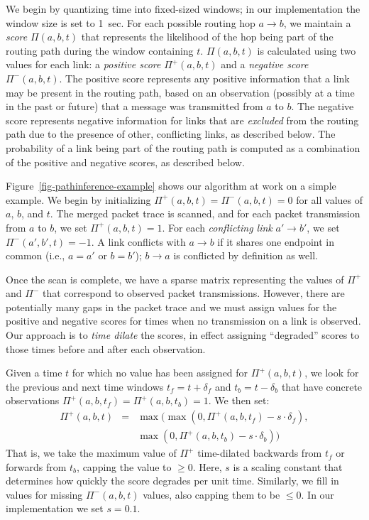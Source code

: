 We begin by quantizing time into fixed-sized windows;
in our implementation the window size is set to 1~sec.
For each possible routing hop $a \rightarrow b$, we maintain a 
{\em score} $\Pi(a,b,t)$ that represents the likelihood of the hop
being part of the routing path during the window containing $t$.
$\Pi(a,b,t)$ is calculated using two values for each link:
a {\em positive score} $\Pi^+(a,b,t)$ and a {\em negative score}
$\Pi^-(a,b,t)$. The positive score represents any positive information
that a link may be present in the routing path, based on an
observation (possibly at a time in the past or future) that a message was
transmitted from $a$ to $b$. The negative score represents negative
information for links that are {\em excluded} from the routing path
due to the presence of other, conflicting links, as described below.
The probability of a link being part of the routing path 
is computed as a combination of the positive and negative scores, 
as described below.

Figure~\ref{fig-pathinference-example} shows our algorithm at work 
on a simple example.  We begin by initializing
$\Pi^+(a,b,t) = \Pi^-(a,b,t) = 0$ for all values of $a$, $b$, and $t$.
The merged packet trace is scanned, and for each packet transmission 
from $a$ to $b$, we set $\Pi^+(a,b,t) = 1$. For each {\em conflicting
link} $a' \rightarrow b'$, we set $\Pi^-(a',b',t) = -1$.
A link conflicts with $a \rightarrow b$ if it shares one endpoint in
common (i.e., $a = a'$ or $b = b'$); $b \rightarrow a$ is conflicted
by definition as well.

Once the scan is complete, we have a sparse matrix representing the
values of $\Pi^+$ and $\Pi^-$ that correspond to observed packet
transmissions. However, there are potentially many gaps in the packet
trace and we must assign values for the positive and negative scores
for times when no transmission on a link is observed. Our approach is to {\em
time dilate} the scores, in effect assigning ``degraded'' scores
to those times before and after each observation. 

Given a time $t$ for which no value has been assigned for $\Pi^+(a,b,t)$, 
we look for the previous and next time windows $t_f = t + \delta_f$ and
$t_b = t - \delta_b$ that have concrete observations 
$\Pi^+(a,b,t_f) = \Pi^+(a,b,t_b) = 1$. We then set:
\begin{eqnarray*}
\Pi^+(a,b,t) & =  & \max( \max(0, \Pi^+(a,b,t_f) - s \cdot \delta_f), \\
             &    & \max(0, \Pi^+(a,b,t_b) - s \cdot \delta_b))
\end{eqnarray*}
That is, we take the maximum value of $\Pi^+$ time-dilated backwards
from $t_f$ or forwards from $t_b$, capping the value to $\geq 0$.
Here, $s$ is a scaling constant that determines how quickly the score
degrades per unit time. 
Similarly, we fill in values for missing $\Pi^-(a,b,t)$ values, also
capping them to be $\leq 0$. In our implementation we set $s = 0.1$.

